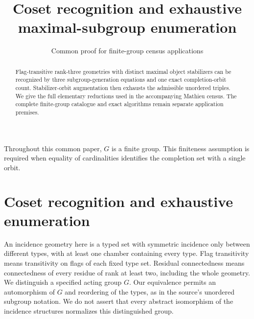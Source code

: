 \documentclass[11pt,a4paper]{article}
\title{Coset recognition and exhaustive maximal-subgroup enumeration}
\author{Common proof for finite-group census applications}
\date{}
\begin{document}
\maketitle
\begin{abstract}
Flag-transitive rank-three geometries with distinct maximal object stabilizers can be recognized by three subgroup-generation equations and one exact completion-orbit count. Stabilizer-orbit augmentation then exhausts the admissible unordered triples. We give the full elementary reductions used in the accompanying Mathieu census. The complete finite-group catalogue and exact algorithms remain separate application premises.
\end{abstract}
Throughout this common paper, $G$ is a finite group. This finiteness assumption is required when equality of cardinalities identifies the completion set with a single orbit.

\section{Coset recognition and exhaustive enumeration}
An incidence geometry here is a typed set with symmetric incidence only between different types, with at least one chamber containing every type. Flag transitivity means transitivity on flags of each fixed type set. Residual connectedness means connectedness of every residue of rank at least two, including the whole geometry. We distinguish a specified acting group $G$. Our equivalence permits an automorphism of $G$ and reordering of the types, as in the source's unordered subgroup notation. We do not assert that every abstract isomorphism of the incidence structures normalizes this distinguished group.
\end{document}
